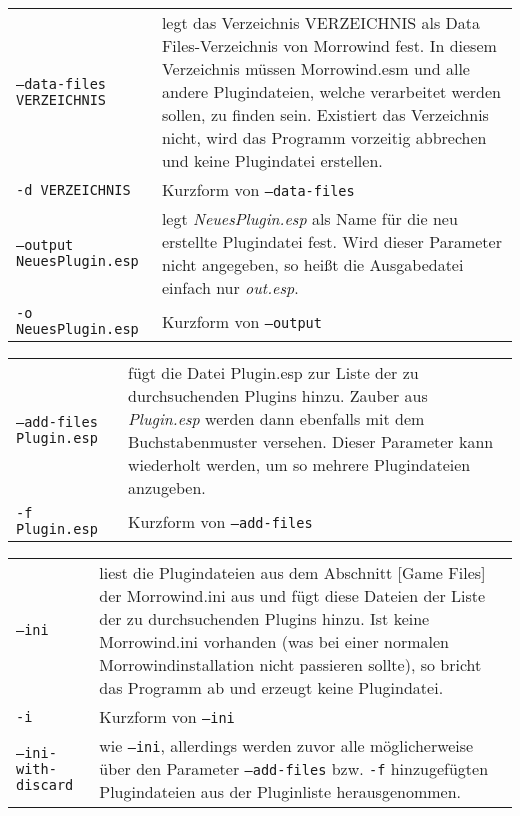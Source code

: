 \documentclass[12pt,oneside,a4paper]{article}
\begin{document}
\begin{tabular}{p{7cm} p{8cm}}
\texttt{--data-files VERZEICHNIS} & legt das Verzeichnis VERZEICHNIS als Data Files-Verzeichnis von Morrowind fest. In diesem Verzeichnis m\"{u}ssen Morrowind.esm und alle andere Plugindateien, welche verarbeitet werden sollen, zu finden sein. Existiert das Verzeichnis nicht, wird das Programm vorzeitig abbrechen und keine Plugindatei erstellen.\\
\texttt{-d VERZEICHNIS}           & Kurzform von \texttt{--data-files}\\
\texttt{--output NeuesPlugin.esp} & legt \textit{NeuesPlugin.esp} als Name f\"{u}r die neu erstellte Plugindatei fest. Wird dieser Parameter nicht angegeben, so hei\ss{}t die Ausgabedatei einfach nur \textit{out.esp}.\\
\texttt{-o NeuesPlugin.esp}       & Kurzform von \texttt{--output}\\
\end{tabular}
\newline
\begin{tabular}{p{7cm} p{8cm}}
\texttt{--add-files Plugin.esp}   & f\"{u}gt die Datei Plugin.esp zur Liste der zu durchsuchenden Plugins hinzu. Zauber aus \textit{Plugin.esp} werden dann ebenfalls mit dem Buchstabenmuster versehen. Dieser Pa\-ra\-me\-ter kann wiederholt werden, um so mehrere Plugindateien anzugeben.\\
\texttt{-f Plugin.esp}            & Kurzform von \texttt{--add-files}\\
\end{tabular}
\newline
\begin{tabular}{p{7cm} p{8cm}}
\texttt{--ini}                    & liest die Plugindateien aus dem Abschnitt [Game Files] der Morrowind.ini aus und f\"{u}gt diese Dateien der Liste der zu durchsuchenden Plugins hinzu. Ist keine Morrowind.ini vorhanden (was bei einer normalen Morrowindinstallation nicht passieren sollte), so bricht das Programm ab und erzeugt keine Plugindatei.\\
\texttt{-i}                       & Kurzform von \texttt{--ini}\\
\texttt{--ini-with-discard}       & wie \texttt{--ini}, allerdings werden zuvor alle m\"{o}glicherweise \"{u}ber den Parameter \texttt{--add-files} bzw. \texttt{-f} hinzugef\"{u}gten Plugindateien aus der Pluginliste herausgenommen.\\
\end{tabular}
\newline
\end{document}
